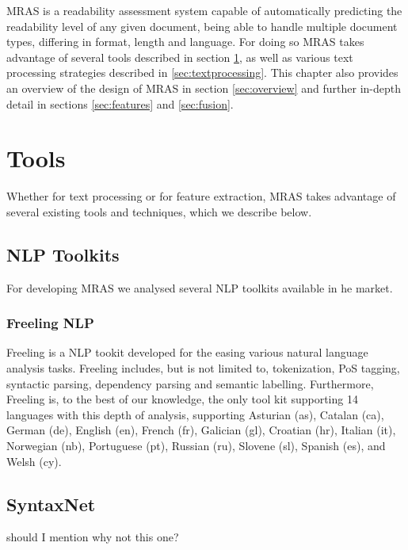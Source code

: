 \documentclass{bsu-ms}
\newcommand{\projectName}{MRAS\xspace}
\begin{document}
\projectName is a readability assessment system capable of automatically predicting the readability level of any given document, being able to handle multiple document types, differing in format, length and language. For doing so \projectName takes advantage of several tools described in section \ref{sec:tools}, as well as various text processing strategies described in \ref{sec:textprocessing}. This chapter also provides an overview of the design of \projectName in section \ref{sec:overview} and further in-depth detail in sections \ref{sec:features} and \ref{sec:fusion}.






\section{Tools}
\label{sec:tools}

Whether for text processing or for feature extraction, \projectName takes advantage of several existing tools and techniques, which we describe below.

\subsection{NLP Toolkits}
For developing \projectName we analysed several NLP toolkits available in he market.





\subsubsection*{Freeling NLP}
Freeling \cite{padro12,padro10b} is a NLP tookit developed for the easing various natural language analysis tasks. Freeling includes, but is not limited to, tokenization, PoS tagging, syntactic parsing, dependency parsing and semantic labelling. Furthermore, Freeling is, to the best of our knowledge, the only tool kit supporting 14 languages with this depth of analysis, supporting Asturian (as), Catalan (ca), German (de), English (en),  French (fr), Galician (gl), Croatian (hr), Italian (it), Norwegian (nb), Portuguese (pt), Russian (ru), Slovene (sl), Spanish (es), and Welsh (cy).


\subsection*{SyntaxNet}
{\color{red} should I mention why not this one?}
\end{document}
